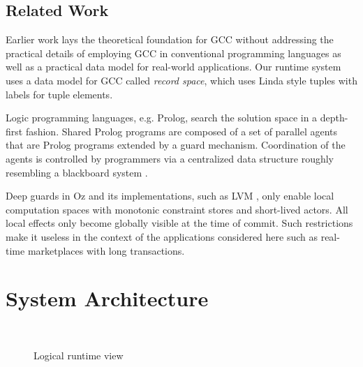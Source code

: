 \documentclass[preprint,10pt]{sigplanconf}
\begin{document}
\subsection{Related Work}

Earlier work \cite{JaffarYZ07} lays the theoretical foundation for GCC
  without addressing the practical details of employing GCC
  in conventional programming languages as well as a  
  practical data model for real-world applications. 
Our runtime system uses a data model for GCC
  called \emph{record space}, which uses Linda style tuples
  \cite{Gelernter85:Linda} with labels for tuple elements. 

Logic programming languages, e.g. Prolog, 
  search the solution space in a depth-first fashion. 
Shared Prolog \cite{BrogiC91} programs are composed of a set of parallel agents 
  that are Prolog programs extended by a guard mechanism. 
Coordination of the agents is controlled by programmers via a centralized 
  data structure roughly resembling a blackboard system \cite{Nii:Blackboard}. 

Deep guards \cite{Smolka94:OzCalculus,SchulteS94} in Oz \cite{Smolka94,SchulteSW94} 
  and its implementations, such as LVM \cite{Mehl:diss}, only enable 
  local computation spaces with monotonic constraint stores and 
  short-lived actors.
All local effects only become globally visible at the time of commit.
Such restrictions make it useless in the context of the applications
considered here such as real-time marketplaces with long transactions. 

\section{System Architecture} %

\begin{figure}
  \centering
   \\
  \caption{Logical runtime view}
\end{figure}
\end{document}
